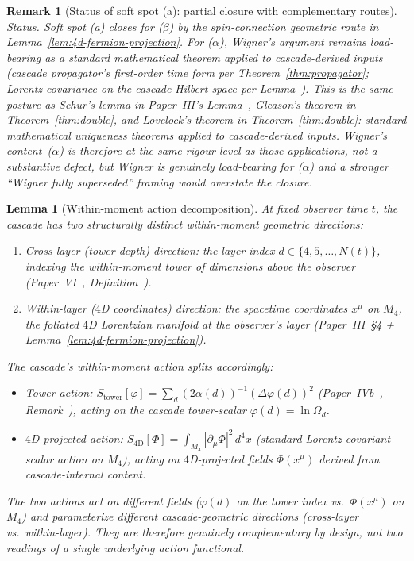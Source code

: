 \documentclass[12pt,a4paper]{article}
\newtheorem{lemma}[theorem]{Lemma}
\newtheorem*{remark}{Remark}
\begin{document}
\begin{remark}[Status of soft spot (a): partial closure with complementary routes]
\emph{Status.} Soft spot (a) closes for ($\beta$) by the
spin-connection geometric route in
Lemma~\ref{lem:4d-fermion-projection}. For ($\alpha$), Wigner's
argument remains load-bearing as a standard mathematical theorem
applied to cascade-derived inputs (cascade propagator's
first-order time form per Theorem~\ref{thm:propagator}; Lorentz
covariance on the cascade Hilbert space per
Lemma~). This is the same posture
as Schur's lemma in Paper~III's
Lemma~, Gleason's theorem in
Theorem~\ref{thm:double}, and Lovelock's theorem in
Theorem~\ref{thm:double}: standard mathematical uniqueness
theorems applied to cascade-derived inputs. Wigner's
content~($\alpha$) is therefore at the same rigour level as
those applications, not a substantive defect, but Wigner is
genuinely load-bearing for ($\alpha$) and a stronger ``Wigner
fully superseded'' framing would overstate the closure.
\end{remark}

\begin{lemma}[Within-moment action decomposition]\label{lem:within-moment-action-decomposition}
At fixed observer time $t$, the cascade has two structurally
distinct within-moment geometric directions:
\begin{enumerate}[label=(\roman*),nosep]
\item \emph{Cross-layer (tower depth) direction}: the layer index
$d \in \{4, 5, \ldots, N(t)\}$, indexing the within-moment tower
of dimensions above the observer (Paper~VI~\cite{part6},
Definition~).
\item \emph{Within-layer ($4$D coordinates) direction}: the
spacetime coordinates $x^\mu$ on $M_4$, the foliated $4$D
Lorentzian manifold at the observer's layer (Paper~III~\S4 +
Lemma~\ref{lem:4d-fermion-projection}).
\end{enumerate}
The cascade's within-moment action splits accordingly:
\begin{itemize}[nosep]
\item \emph{Tower-action}: $S_{\text{tower}}[\varphi] =
\sum_d (2\alpha(d))^{-1}(\Delta\varphi(d))^2$
(Paper~IVb~\cite{part4b}, Remark~),
acting on the cascade tower-scalar $\varphi(d) = \ln\Omega_d$.
\item \emph{$4$D-projected action}: $S_{4\mathrm{D}}[\Phi] =
\int_{M_4} |\partial_\mu\Phi|^2\,d^4x$ (standard Lorentz-covariant
scalar action on $M_4$), acting on $4$D-projected fields
$\Phi(x^\mu)$ derived from cascade-internal content.
\end{itemize}
The two actions act on \emph{different fields} ($\varphi(d)$ on
the tower index vs.\ $\Phi(x^\mu)$ on $M_4$) and parameterize
different cascade-geometric directions (cross-layer vs.\
within-layer). They are therefore genuinely complementary by
design, not two readings of a single underlying action functional.
\end{lemma}
\end{document}
